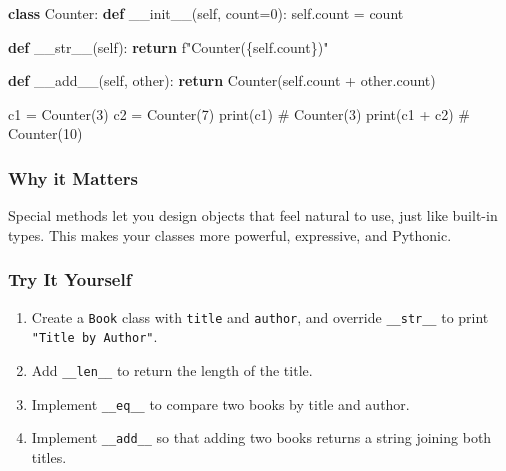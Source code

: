 \documentclass[
  letterpaper,
  DIV=11,
  numbers=noendperiod]{scrreprt}
\newenvironment{Shaded}{\begin{snugshade}}{\end{snugshade}}
\newcommand{\BuiltInTok}[1]{\textcolor[rgb]{0.00,0.23,0.31}{#1}}
\newcommand{\CommentTok}[1]{\textcolor[rgb]{0.37,0.37,0.37}{#1}}
\newcommand{\ControlFlowTok}[1]{\textcolor[rgb]{0.00,0.23,0.31}{\textbf{#1}}}
\newcommand{\DecValTok}[1]{\textcolor[rgb]{0.68,0.00,0.00}{#1}}
\newcommand{\FunctionTok}[1]{\textcolor[rgb]{0.28,0.35,0.67}{#1}}
\newcommand{\KeywordTok}[1]{\textcolor[rgb]{0.00,0.23,0.31}{\textbf{#1}}}
\newcommand{\NormalTok}[1]{\textcolor[rgb]{0.00,0.23,0.31}{#1}}
\newcommand{\OperatorTok}[1]{\textcolor[rgb]{0.37,0.37,0.37}{#1}}
\newcommand{\SpecialCharTok}[1]{\textcolor[rgb]{0.37,0.37,0.37}{#1}}
\newcommand{\SpecialStringTok}[1]{\textcolor[rgb]{0.13,0.47,0.30}{#1}}
\newcommand{\VariableTok}[1]{\textcolor[rgb]{0.07,0.07,0.07}{#1}}
\providecommand{\tightlist}{%
  \setlength{\itemsep}{0pt}\setlength{\parskip}{0pt}}
\begin{document}
\begin{Shaded}
\begin{Highlighting}[]
\KeywordTok{class}\NormalTok{ Counter:}
    \KeywordTok{def} \FunctionTok{\_\_init\_\_}\NormalTok{(}\VariableTok{self}\NormalTok{, count}\OperatorTok{=}\DecValTok{0}\NormalTok{):}
        \VariableTok{self}\NormalTok{.count }\OperatorTok{=}\NormalTok{ count}
    
    \KeywordTok{def} \FunctionTok{\_\_str\_\_}\NormalTok{(}\VariableTok{self}\NormalTok{):}
        \ControlFlowTok{return} \SpecialStringTok{f"Counter(}\SpecialCharTok{\{}\VariableTok{self}\SpecialCharTok{.}\NormalTok{count}\SpecialCharTok{\}}\SpecialStringTok{)"}
    
    \KeywordTok{def} \FunctionTok{\_\_add\_\_}\NormalTok{(}\VariableTok{self}\NormalTok{, other):}
        \ControlFlowTok{return}\NormalTok{ Counter(}\VariableTok{self}\NormalTok{.count }\OperatorTok{+}\NormalTok{ other.count)}

\NormalTok{c1 }\OperatorTok{=}\NormalTok{ Counter(}\DecValTok{3}\NormalTok{)}
\NormalTok{c2 }\OperatorTok{=}\NormalTok{ Counter(}\DecValTok{7}\NormalTok{)}
\BuiltInTok{print}\NormalTok{(c1)           }\CommentTok{\# Counter(3)}
\BuiltInTok{print}\NormalTok{(c1 }\OperatorTok{+}\NormalTok{ c2)      }\CommentTok{\# Counter(10)}
\end{Highlighting}
\end{Shaded}

\subsubsection{Why it Matters}\label{why-it-matters-68}

Special methods let you design objects that feel natural to use, just
like built-in types. This makes your classes more powerful, expressive,
and Pythonic.

\subsubsection{Try It Yourself}\label{try-it-yourself-68}

\begin{enumerate}
\def\labelenumi{\arabic{enumi}.}
\tightlist
\item
  Create a \texttt{Book} class with \texttt{title} and \texttt{author},
  and override \texttt{\_\_str\_\_} to print
  \texttt{"Title\ by\ Author"}.
\item
  Add \texttt{\_\_len\_\_} to return the length of the title.
\item
  Implement \texttt{\_\_eq\_\_} to compare two books by title and
  author.
\item
  Implement \texttt{\_\_add\_\_} so that adding two books returns a
  string joining both titles.
\end{enumerate}
\end{document}
